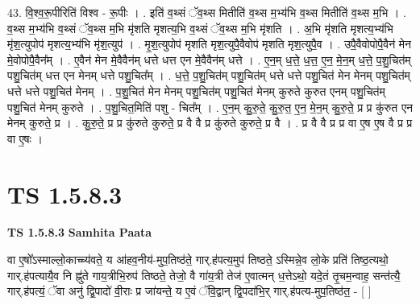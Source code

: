 \documentclass[17pt]{extarticle}
\begin{document}
43. वि॒श्व॒रू॒पीरिति॑ विश्व - रू॒पीः । . इति॑ व॒थ्सं ॅव॒थ्स मितीति॑ व॒थ्स म॒भ्य॑भि व॒थ्स मितीति॑ व॒थ्स म॒भि । . व॒थ्स म॒भ्य॑भि व॒थ्सं ॅव॒थ्स म॒भि मृ॑शति मृशत्य॒भि व॒थ्सं ॅव॒थ्स म॒भि मृ॑शति । . अ॒भि मृ॑शति मृशत्य॒भ्य॑भि मृ॑श॒त्युपोप॑ मृशत्य॒भ्य॑भि मृ॑श॒त्युप॑ । . मृ॒श॒त्युपोप॑ मृशति मृश॒त्युपै॒वैवोप॑ मृशति मृश॒त्युपै॒व । . उपै॒वैवोपोपै॒वैन॑ मेन मे॒वोपोपै॒वैन᳚म् । . ए॒वैन॑ मेन मे॒वैवैन॑म् धत्ते धत्त एन मे॒वैवैन॑म् धत्ते । . ए॒न॒म् ध॒त्ते॒ ध॒त्त॒ ए॒न॒ मे॒न॒म् ध॒त्ते॒ प॒शु॒चित॑म् पशु॒चित॑म् धत्त एन मेनम् धत्ते पशु॒चित᳚म् । . ध॒त्ते॒ प॒शु॒चित॑म् पशु॒चित॑म् धत्ते धत्ते पशु॒चित॑ मेन मेनम् पशु॒चित॑म् धत्ते धत्ते पशु॒चित॑ मेनम् । . प॒शु॒चित॑ मेन मेनम् पशु॒चित॑म् पशु॒चित॑ मेनम् कुरुते कुरुत एनम् पशु॒चित॑म् पशु॒चित॑ मेनम् कुरुते । . प॒शु॒चित॒मिति॑ पशु - चित᳚म् । . ए॒न॒म् कु॒रु॒ते॒ कु॒रु॒त॒ ए॒न॒ मे॒न॒म् कु॒रु॒ते॒ प्र प्र कु॑रुत एन मेनम् कुरुते॒ प्र । . कु॒रु॒ते॒ प्र प्र कु॑रुते कुरुते॒ प्र वै वै प्र कु॑रुते कुरुते॒ प्र वै । . प्र वै वै प्र प्र वा ए॒ष ए॒ष वै प्र प्र वा ए॒षः । \newline
\pagebreak
{}
\section*{ TS 1.5.8.3 }

\textbf{TS 1.5.8.3 } \newline
\textbf{Samhita Paata} \newline

वा ए॒षो᳚ऽस्माल्लो॒काच्च्य॑वते॒ य आ॑हव॒नीय॑-मुप॒तिष्ठ॑ते॒ गार्.ह॑पत्य॒मुप॑ तिष्ठते॒ ऽस्मिन्ने॒व लो॒के प्रति॑ तिष्ठ॒त्यथो॒ गार्.ह॑पत्यायै॒व नि ह्नु॑ते गाय॒त्रीभि॒रुप॑ तिष्ठते॒ तेजो॒ वै गा॑य॒त्री तेज॑ ए॒वात्मन् ध॒त्तेऽथो॒ यदे॒तं तृ॒चम॒न्वाह॒ सन्त॑त्यै॒ गार्.ह॑पत्यं॒ ॅवा अनु॑ द्वि॒पादो॑ वी॒राः प्र जा॑यन्ते॒ य ए॒वं ॅवि॒द्वान् द्वि॒पदा॑भि॒र् गार्.ह॑पत्य-मुप॒तिष्ठ॑त॒ - [ ] \newline
\end{document}

